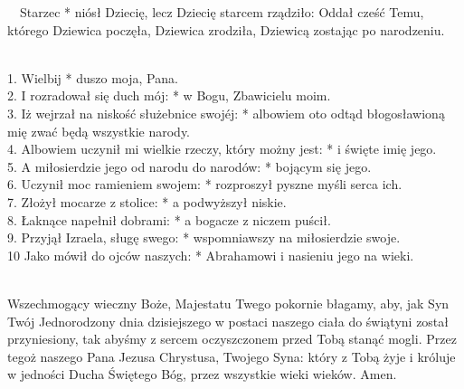 ~~Starzec * niósł Dziecię, lecz Dziecię starcem rządziło: Oddał cześć Temu, którego Dziewica poczęła, Dziewica zrodziła, Dziewicą zostając po narodzeniu.

\\
1. Wielbij * duszo moja, Pana.\\
2. I rozradował się duch mój: * w Bogu, Zbawicielu moim.\\
3. Iż wejrzał na niskość służebnice swojéj: * albowiem oto odtąd błogosławioną mię zwać będą wszystkie narody.\\
4. Albowiem uczynił mi wielkie rzeczy, który możny jest: * i święte imię jego.\\
5. A miłosierdzie jego od narodu do narodów: * bojącym się jego.\\
6. Uczynił moc ramieniem swojem: * rozproszył pyszne myśli serca ich.\\
7. Złożył mocarze z stolice: * a podwyższył niskie.\\
8. Łaknące napełnił dobrami: * a bogacze z niczem puścił.\\
9. Przyjął Izraela, sługę swego: * wspomniawszy na miłosierdzie swoje.\\
10 Jako mówił do ojców naszych: * Abrahamowi i nasieniu jego na wieki.

\\
Wszechmogący wieczny Boże, Majestatu Twego pokornie błagamy, aby, jak Syn Twój Jednorodzony dnia dzisiejszego w postaci naszego ciała do świątyni został przyniesiony, tak abyśmy z sercem oczyszczonem przed Tobą stanąć mogli.
Przez tegoż naszego Pana Jezusa Chrystusa, Twojego Syna: który z Tobą żyje i króluje w jedności Ducha Świętego Bóg, przez wszystkie wieki wieków. Amen.
